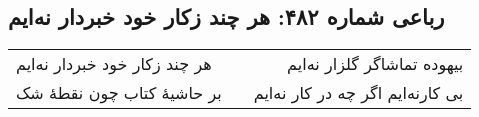 \begin{center}
\section*{رباعی شماره ۴۸۲: هر چند زکار خود خبردار نه‌ایم}
\label{sec:sh482}
\begin{longtable}{l p{0.5cm} r}
هر چند زکار خود خبردار نه‌ایم
&&
بیهوده تماشاگر گلزار نه‌ایم
\\
بر حاشیهٔ کتاب چون نقطهٔ شک
&&
بی کارنه‌ایم اگر چه در کار نه‌ایم
\\
\end{longtable}
\end{center}
